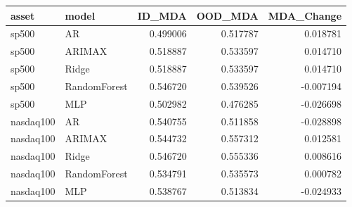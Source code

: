 \begin{tabular}{llrrr}
\toprule
asset & model & ID_MDA & OOD_MDA & MDA_Change \\
\midrule
sp500 & AR & 0.499006 & 0.517787 & 0.018781 \\
sp500 & ARIMAX & 0.518887 & 0.533597 & 0.014710 \\
sp500 & Ridge & 0.518887 & 0.533597 & 0.014710 \\
sp500 & RandomForest & 0.546720 & 0.539526 & -0.007194 \\
sp500 & MLP & 0.502982 & 0.476285 & -0.026698 \\
nasdaq100 & AR & 0.540755 & 0.511858 & -0.028898 \\
nasdaq100 & ARIMAX & 0.544732 & 0.557312 & 0.012581 \\
nasdaq100 & Ridge & 0.546720 & 0.555336 & 0.008616 \\
nasdaq100 & RandomForest & 0.534791 & 0.535573 & 0.000782 \\
nasdaq100 & MLP & 0.538767 & 0.513834 & -0.024933 \\
\bottomrule
\end{tabular}
